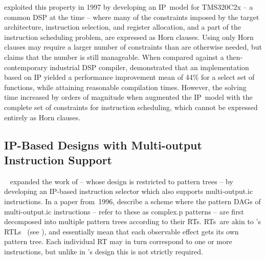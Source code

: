 \textcite{Gebotys1997a} exploited this property in 1997 by developing an
\gls{IP}~model for \gls{TMS320C2x} -- a common \gls{DSP} at the time -- where
many of the \glspl{constraint} imposed by the target architecture, \gls{instruction
  selection}, and \gls{register allocation}, and a part of the \gls{instruction
  scheduling} problem, are expressed as \glspl{Horn clause}.
%
Using only \glspl{Horn
  clause} may require a larger number of \glspl{constraint} than are otherwise needed,
but \citeauthor{Gebotys1997a} claims that the number is still manageable.
%
When
compared against a then-contemporary industrial \gls{DSP} \gls{compiler},
\citeauthor{Gebotys1997a} demonstrated that an implementation based on \gls{IP}
yielded a performance improvement mean of 44\% for a select set of functions,
while attaining reasonable compilation times.
%
However, the solving time
increased by orders of magnitude when \citeauthor{Gebotys1997a} augmented the
\gls{IP}~model with the complete set of \glspl{constraint} for \gls{instruction scheduling},
which cannot be expressed entirely as \glspl{Horn clause}.


\subsection{IP-Based Designs with Multi-output Instruction Support}

\citeauthor{Leupers1996}~\cite{Leupers1995, Leupers1996} expanded the work of
\citeauthor{Wilson1994}\unskip%
%
 -- whose design is restricted to \glspl{pattern tree} -- by developing an
\gls{IP}-based \gls{instruction selector} which also supports
\gls{multi-output.ic} \glspl{instruction}.
%
In a paper from~1996, \citeauthor{Leupers1996}
describe a scheme where the \glspl{pattern DAG} of \gls{multi-output.ic} \glspl{instruction} -- \citeauthor{Leupers1996} refer to these as
\gls{complex.p} \glspl{pattern}\unskip%
%
 -- are first decomposed into multiple \glspl{pattern tree} according to their
\glspl{RT}.
%
\glspl{RT}~are akin to \citeauthor{Fraser1979}'s
\glspl{RTL}~\cite{Fraser1979} (see ), and
essentially mean that each observable effect gets its own \gls{pattern
  tree}.
%
Each individual \gls{RT} may in turn correspond to one or more
\glspl{instruction}, but unlike in \citeauthor{Fraser1979}'s design this is not
strictly required.

